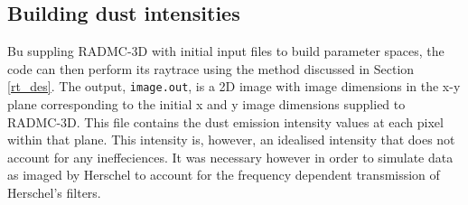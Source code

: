 \documentclass{report}
\begin{document}

\subsection{Building dust intensities}
Bu suppling RADMC-3D with initial input files to build parameter spaces, the code can then perform its raytrace using the method discussed in Section \ref{rt_des}. The output, \texttt{image.out}, is a 2D image with image dimensions in the x-y plane corresponding to the initial x and y image dimensions supplied to RADMC-3D. This file contains the dust emission intensity values at each pixel within that plane. This intensity is, however, an idealised intensity that does not account for any ineffeciences. It was necessary however in order to simulate data as imaged by Herschel to account for the frequency dependent transmission of Herschel's filters.
\end{document}

